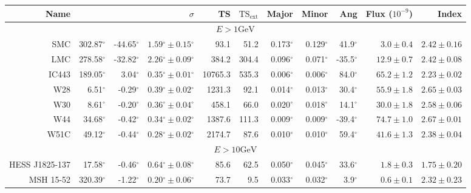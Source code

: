 \documentclass[12pt,preprint]{aastex}
\newcommand{\gev}{\text{GeV}\xspace}
\newcommand{\tsext}{{\ensuremath{\text{TS}_\text{ext}}}\xspace}
\newcommand{\glon}{\text{GLON}\xspace}
\newcommand{\glat}{\text{GLAT}\xspace}
\renewcommand{\deg}{\ensuremath{^\circ}\xspace}
\begin{document}
\clearpage
\begin{table}
    \begin{centering}
      \begin{tabular}{r|rrrrrrrrrr}
        \hline
        \hline
        Name                 &          \glon &          \glat &                    $\sigma$ &       TS &   $\tsext$ &      Major &      Minor &        Ang &      Flux ($10^{-9}$) &                 Index \\
        \hline
        \multicolumn{11}{c}{$E > 1\gev$} \\
        \hline
        SMC                  &     302.87\deg &     -44.65\deg & $  1.59\deg \pm   0.15\deg$ &     93.1 &       51.2 &  0.173\deg &  0.129\deg &   41.9\deg & $    3.0 \pm     0.4$ & $   2.42 \pm    0.16$ \\
        LMC                  &     278.58\deg &     -32.82\deg & $  2.26\deg \pm   0.09\deg$ &    384.2 &      304.4 &  0.096\deg &  0.071\deg &  -35.5\deg & $   12.9 \pm     0.7$ & $   2.42 \pm    0.08$ \\
        IC443                &     189.05\deg &       3.04\deg & $  0.35\deg \pm   0.01\deg$ &  10765.3 &      535.3 &  0.006\deg &  0.006\deg &   84.0\deg & $   65.2 \pm     1.2$ & $   2.23 \pm    0.02$ \\
        W28                  &       6.51\deg &      -0.29\deg & $  0.39\deg \pm   0.02\deg$ &   1231.3 &       92.1 &  0.014\deg &  0.013\deg &   30.4\deg & $   55.9 \pm     1.8$ & $   2.65 \pm    0.03$ \\
        W30                  &       8.61\deg &      -0.20\deg & $  0.36\deg \pm   0.04\deg$ &    458.1 &       66.0 &  0.020\deg &  0.018\deg &   14.1\deg & $   30.0 \pm     1.8$ & $   2.58 \pm    0.06$ \\
        W44                  &      34.68\deg &      -0.42\deg & $  0.34\deg \pm   0.02\deg$ &   1387.6 &      111.3 &  0.009\deg &  0.009\deg &  -39.4\deg & $   74.7 \pm     1.0$ & $   2.67 \pm    0.01$ \\
        W51C                 &      49.12\deg &      -0.44\deg & $  0.28\deg \pm   0.02\deg$ &   2174.7 &       87.6 &  0.010\deg &  0.010\deg &   59.4\deg & $   41.6 \pm     1.3$ & $   2.38 \pm    0.04$ \\
        \hline
        \multicolumn{11}{c}{$E > 10\gev$} \\
        \hline
        HESS J1825-137       &      17.58\deg &      -0.46\deg & $  0.64\deg \pm   0.08\deg$ &     85.6 &       62.5 &  0.050\deg &  0.045\deg &   33.6\deg & $    1.8 \pm     0.3$ & $   1.75 \pm    0.20$ \\
        MSH 15-52            &     320.39\deg &      -1.22\deg & $  0.20\deg \pm   0.06\deg$ &     73.7 &        9.5 &  0.033\deg &  0.032\deg &    3.9\deg & $    0.6 \pm     0.1$ & $   2.32 \pm    0.23$ \\


\end{tabular}
\end{centering}
\end{table}
\end{document}
